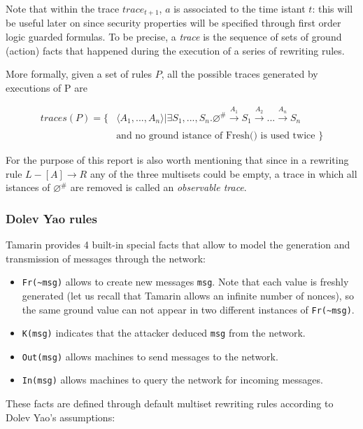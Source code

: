 \documentclass[fleqn,10pt]{SelfArx} %
\begin{document}
Note that within the trace $trace_{t+1}$, $a$ is associated to the time istant $t$: this will be useful later on since security properties will be specified through first order logic guarded formulas. To be precise, a \textit{trace} is the sequence of sets of ground (action) facts that happened during the execution of a series of rewriting rules.

More formally, given a set of rules $P$, all the possible traces generated by executions of P are

\begin{align*}
    traces(P) = \{ &\langle A_1,...,A_n \rangle | \exists S_1,...,S_n . \varnothing ^{\#} \xrightarrow[]{A_1} S_1 \xrightarrow[]{A_2} ... \xrightarrow[]{A_n} S_n\\
    & \textrm{and no ground istance of Fresh() is used twice }\}
\end{align*}

For the purpose of this report is also worth mentioning that since in a rewriting rule $L -[ A ] \rightarrow R$ any of the three multisets could be empty, a trace in which all istances of $\varnothing^{\#}$ are removed is called an \textit{observable trace}. 

\subsubsection{Dolev Yao rules}
Tamarin provides 4 built-in special facts that allow to model the generation and transmission of messages through the network:

\begin{itemize}
    \item \lstinline|Fr(~msg)| allows to create new messages \lstinline|msg|. Note that each value is freshly generated (let us recall that Tamarin allows an infinite number of nonces), so the same ground value can not appear in two different instances of \lstinline|Fr(~msg)|.
    \item \lstinline|K(msg)| indicates that the attacker deduced \lstinline|msg| from the network.
    \item \lstinline|Out(msg)| allows machines to send messages to the network.
    \item \lstinline|In(msg)| allows machines to query the network for incoming messages.
\end{itemize}

These facts are defined through default multiset rewriting rules according to Dolev Yao's assumptions:
\end{document}
